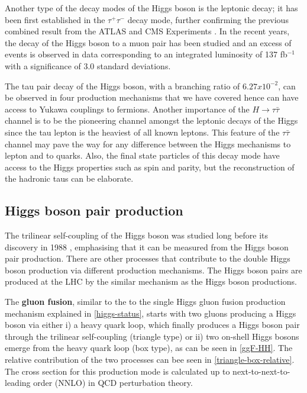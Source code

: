 Another type of the decay modes of the Higgs boson is the leptonic decay; it has been first established in the $\tau^+\tau^-$ decay mode\cite{CMS-PAS-HIG-16-043}, further confirming the previous combined result from the ATLAS and CMS Experiments \cite{Aad2016}. In the recent years, the decay of the Higgs boson to a muon pair has been studied and an excess of events is observed in data corresponding to an integrated luminosity of 137 fb$^{-1}$ with a significance of 3.0 standard deviations\cite{CMS-PAS-HIG-19-006}.

The tau pair decay of the Higgs boson, with a branching ratio of $6.27x10^{-2}$, can be observed in four production mechanisms that we have covered hence can have access to Yukawa couplings to fermions. Another importance of the $H\rightarrow\tau\bar\tau$ channel is to be the pioneering channel amongst the leptonic decays of the Higgs since the tau lepton is the heaviest of all known leptons. This feature of the $\tau\bar\tau$ channel may pave the way for any difference between the Higgs mechanisms to lepton and to quarks. Also, the final state particles of this decay mode have access to the Higgs properties such as spin and parity, but the reconstruction of the hadronic taus can be elaborate. 

\subsection{Higgs boson pair production}

The trilinear self-coupling of the Higgs boson was studied long before its discovery in 1988 \cite{GLOVER1988282}, emphasising that it can be measured from the Higgs boson pair production. There are other processes that contribute to the double Higgs boson production via different production mechanisms. The Higgs boson pairs are produced at the LHC by the similar mechanism as the Higgs boson productions. 

The \textbf{gluon fusion}, similar to the to the single Higgs gluon fusion production mechanism explained in \autoref{higgs-status}, starts with two gluons producing a Higgs boson via either i) a heavy quark loop, which finally produces a Higgs boson pair through the trilinear self-coupling (triangle type) or ii) two on-shell Higgs bosons emerge from the heavy quark loop (box type), as can be seen in \autoref{ggF-HH}. The relative contribution of the two processes can bee seen in \autoref{triangle-box-relative}. The cross section for this production mode is calculated up to next-to-next-to-leading order (NNLO) in QCD perturbation theory\cite{deFlorian2016}.

